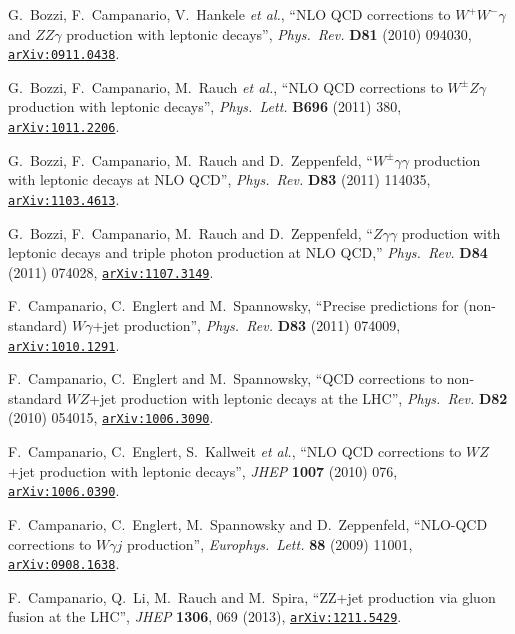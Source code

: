 \documentclass[english,12pt]{article}
\begin{document}
\begin{thebibliography}{10}
  G.~Bozzi, F.~Campanario, V.~Hankele {\it et al.},
  ``{NLO QCD corrections to $W^+W^- \gamma$ and $Z Z \gamma$ production with leptonic decays}'',
  {\em Phys.\ Rev.}  {\bf D81} (2010) 094030,
\href{http://www.arXiv.org/abs/0911.0438}{{\tt arXiv:0911.0438}}.

  G.~Bozzi, F.~Campanario, M.~Rauch  {\it et al.},
  ``NLO QCD corrections to $W^\pm Z\gamma$ production with leptonic decays'',
  {\em Phys.\ Lett.} {\bf B696} (2011) 380,
\href{http://www.arXiv.org/abs/1011.2206}{{\tt arXiv:1011.2206}}.
  
  G.~Bozzi, F.~Campanario, M.~Rauch and D.~Zeppenfeld,
  ``$W^{\pm}\gamma \gamma$ production with leptonic decays at NLO QCD'',
  {\em Phys.\ Rev.}  {\bf D83} (2011) 114035,
  \href{http://arxiv.org/abs/1103.4613}{{\tt arXiv:1103.4613}}.

  G.~Bozzi, F.~Campanario, M.~Rauch and D.~Zeppenfeld,
  ``$Z\gamma\gamma$ production with leptonic decays and triple photon production at NLO QCD,''
  {\em Phys.\ Rev.} {\bf D84} (2011) 074028,
  \href{http://arxiv.org/abs/1107.3149}{{\tt arXiv:1107.3149}}.
  
  F.~Campanario, C.~Englert and M.~Spannowsky,
  ``Precise predictions for (non-standard) $W \gamma$+jet production'',
  {\em Phys.\ Rev.}  {\bf D83} (2011) 074009,
  \href{http://arxiv.org/abs/1010.1291}{{\tt arXiv:1010.1291}}.
 
  F.~Campanario, C.~Englert and M.~Spannowsky,
  ``QCD corrections to non-standard $WZ$+jet production with leptonic decays at
  the LHC'',
  {\em Phys.\ Rev.} {\bf D82} (2010) 054015,
\href{http://www.arXiv.org/abs/1006.3090}{{\tt arXiv:1006.3090}}.
  
  F.~Campanario, C.~Englert, S.~Kallweit {\it et al.},
  ``{NLO QCD corrections to $WZ$+jet production with leptonic decays}'',
  {\em JHEP} {\bf 1007} (2010) 076,
\href{http://www.arXiv.org/abs/1006.0390}{{\tt arXiv:1006.0390}}.
   
  F.~Campanario, C.~Englert, M.~Spannowsky and D.~Zeppenfeld,
  ``NLO-QCD corrections to $W\gamma j$ production'',
  {\em Europhys.\ Lett.}  {\bf 88} (2009) 11001,
\href{http://www.arXiv.org/abs/0908.1638}{{\tt arXiv:0908.1638}}.

  F.~Campanario, Q.~Li, M.~Rauch and M.~Spira,
  ``ZZ+jet production via gluon fusion at the LHC'',
  {\em JHEP} {\bf 1306}, 069 (2013),
\href{http://www.arXiv.org/abs/1211.5429}{{\tt arXiv:1211.5429}}.


\end{thebibliography}
\end{document}
